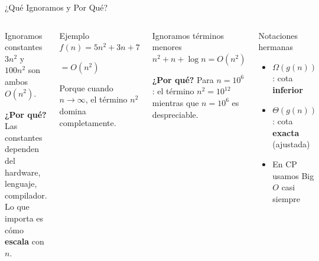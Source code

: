 \documentclass[aspectratio=169]{beamer}
\begin{document}
\begin{frame}{¿Qué Ignoramos y Por Qué?}
    \begin{columns}[t]
        \begin{block}{Ignoramos constantes}
            $3n^2$ y $100n^2$ son ambos $O(n^2)$.
            
            \vspace{0.2cm}
            \textbf{¿Por qué?} Las constantes dependen del hardware, lenguaje, compilador. Lo que importa es cómo \textbf{escala} con $n$.
        \end{block}
        
        \begin{exampleblock}{Ejemplo}
            $f(n) = 5n^2 + 3n + 7$
            
            \vspace{0.1cm}
            $= O(n^2)$
            
            \vspace{0.1cm}
            Porque cuando $n \rightarrow \infty$, el término $n^2$ domina completamente.
        \end{exampleblock}
        
        \begin{block}{Ignoramos términos menores}
            $n^2 + n + \log n = O(n^2)$
            
            \vspace{0.2cm}
            \textbf{¿Por qué?} Para $n = 10^6$: el término $n^2 = 10^{12}$ mientras que $n = 10^6$ es despreciable.
        \end{block}
        
        \begin{alertblock}{Notaciones hermanas}
            \begin{itemize}
                \item $\Omega(g(n))$: cota \textbf{inferior}
                \item $\Theta(g(n))$: cota \textbf{exacta} (ajustada)
                \item En CP usamos Big $O$ casi siempre
            \end{itemize}
        \end{alertblock}
    \end{columns}
\end{frame}
\end{document}
